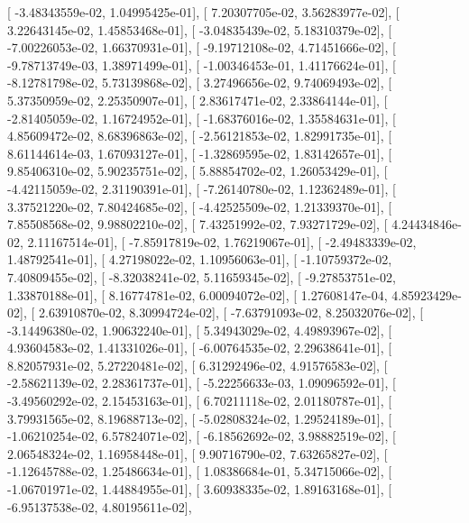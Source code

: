 \documentclass{article}
\begin{document}
       [ -3.48343559e-02,   1.04995425e-01],
       [  7.20307705e-02,   3.56283977e-02],
       [  3.22643145e-02,   1.45853468e-01],
       [ -3.04835439e-02,   5.18310379e-02],
       [ -7.00226053e-02,   1.66370931e-01],
       [ -9.19712108e-02,   4.71451666e-02],
       [ -9.78713749e-03,   1.38971499e-01],
       [ -1.00346453e-01,   1.41176624e-01],
       [ -8.12781798e-02,   5.73139868e-02],
       [  3.27496656e-02,   9.74069493e-02],
       [  5.37350959e-02,   2.25350907e-01],
       [  2.83617471e-02,   2.33864144e-01],
       [ -2.81405059e-02,   1.16724952e-01],
       [ -1.68376016e-02,   1.35584631e-01],
       [  4.85609472e-02,   8.68396863e-02],
       [ -2.56121853e-02,   1.82991735e-01],
       [  8.61144614e-03,   1.67093127e-01],
       [ -1.32869595e-02,   1.83142657e-01],
       [  9.85406310e-02,   5.90235751e-02],
       [  5.88854702e-02,   1.26053429e-01],
       [ -4.42115059e-02,   2.31190391e-01],
       [ -7.26140780e-02,   1.12362489e-01],
       [  3.37521220e-02,   7.80424685e-02],
       [ -4.42525509e-02,   1.21339370e-01],
       [  7.85508568e-02,   9.98802210e-02],
       [  7.43251992e-02,   7.93271729e-02],
       [  4.24434846e-02,   2.11167514e-01],
       [ -7.85917819e-02,   1.76219067e-01],
       [ -2.49483339e-02,   1.48792541e-01],
       [  4.27198022e-02,   1.10956063e-01],
       [ -1.10759372e-02,   7.40809455e-02],
       [ -8.32038241e-02,   5.11659345e-02],
       [ -9.27853751e-02,   1.33870188e-01],
       [  8.16774781e-02,   6.00094072e-02],
       [  1.27608147e-04,   4.85923429e-02],
       [  2.63910870e-02,   8.30994724e-02],
       [ -7.63791093e-02,   8.25032076e-02],
       [ -3.14496380e-02,   1.90632240e-01],
       [  5.34943029e-02,   4.49893967e-02],
       [  4.93604583e-02,   1.41331026e-01],
       [ -6.00764535e-02,   2.29638641e-01],
       [  8.82057931e-02,   5.27220481e-02],
       [  6.31292496e-02,   4.91576583e-02],
       [ -2.58621139e-02,   2.28361737e-01],
       [ -5.22256633e-03,   1.09096592e-01],
       [ -3.49560292e-02,   2.15453163e-01],
       [  6.70211118e-02,   2.01180787e-01],
       [  3.79931565e-02,   8.19688713e-02],
       [ -5.02808324e-02,   1.29524189e-01],
       [ -1.06210254e-02,   6.57824071e-02],
       [ -6.18562692e-02,   3.98882519e-02],
       [  2.06548324e-02,   1.16958448e-01],
       [  9.90716790e-02,   7.63265827e-02],
       [ -1.12645788e-02,   1.25486634e-01],
       [  1.08386684e-01,   5.34715066e-02],
       [ -1.06701971e-02,   1.44884955e-01],
       [  3.60938335e-02,   1.89163168e-01],
       [ -6.95137538e-02,   4.80195611e-02],
\end{document}
